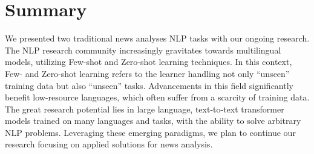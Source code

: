 \section{Summary}

We presented two traditional news analyses NLP tasks with our ongoing research.
The NLP research community increasingly gravitates towards multilingual models, utilizing Few-shot and Zero-shot learning techniques.
In this context, Few- and Zero-shot learning refers to the learner handling not only ``unseen'' training data but also ``unseen'' tasks.
Advancements in this field significantly benefit low-resource languages, which often suffer from a scarcity of training data.
The great research potential lies in large language, text-to-text transformer models trained on many languages and tasks, with the ability to solve arbitrary NLP problems.
Leveraging these emerging paradigms, we plan to continue our research focusing on applied solutions for news analysis.

